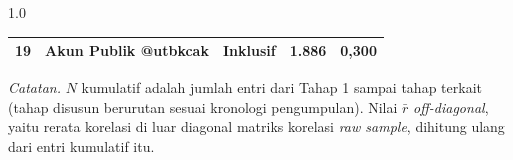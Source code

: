 \begin{table}[H]
\begin{spacing}{1.0}
{\begin{tabular}{cllcc}
        19 & Akun Publik @utbkcak           & Inklusif        & 1.886 & 0,300 \\
        \bottomrule
    \end{tabular}%
    }
    \end{spacing}
    \vspace{2mm}
    \begin{flushleft}
    \footnotesize\textit{Catatan.} $N$ kumulatif adalah jumlah entri dari Tahap 1 sampai tahap terkait (tahap disusun berurutan sesuai kronologi pengumpulan). Nilai $\bar{r}$ \textit{off-diagonal}, yaitu rerata korelasi di luar diagonal matriks korelasi \textit{raw sample}, dihitung ulang dari entri kumulatif itu.
    \end{flushleft}
\end{table}
